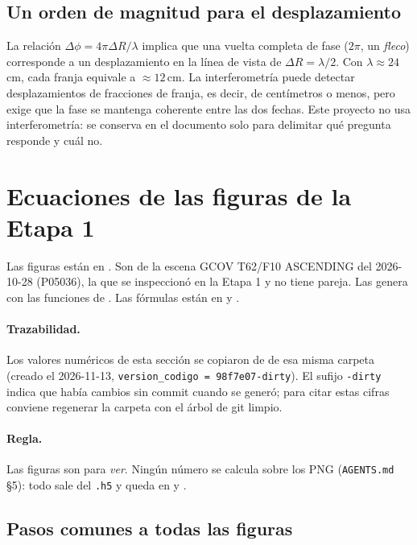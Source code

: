 \documentclass[11pt,a4paper]{article}
\begin{document}
\subsection{Un orden de magnitud para el desplazamiento}

La relación $\Delta\phi=4\pi\Delta R/\lambda$ implica que una vuelta completa de fase ($2\pi$, un \emph{fleco})
corresponde a un desplazamiento en la línea de vista de $\Delta R=\lambda/2$. Con $\lambda\approx24$\,cm, cada
franja equivale a $\approx12$\,cm. La interferometría puede detectar desplazamientos de fracciones de franja,
es decir, de centímetros o menos, pero exige que la fase se mantenga coherente entre las dos fechas. Este
proyecto no usa interferometría: se conserva en el documento solo para delimitar qué pregunta responde y
cuál no.

\section{Ecuaciones de las figuras de la Etapa 1}
\label{sec:figuras}

Las figuras están en
.
Son de la escena GCOV T62/F10 ASCENDING del 2026-10-28 (P05036), la que se inspeccionó en la Etapa 1 y no tiene pareja. Las genera
 con las funciones de . Las fórmulas están en
 y .

\paragraph{Trazabilidad.} Los valores numéricos de esta sección se copiaron de  de esa misma carpeta (creado el
2026-11-13, \texttt{version\_codigo = 98f7e07-dirty}). El sufijo \texttt{-dirty} indica que había cambios sin commit cuando se generó;
para citar estas cifras conviene regenerar la carpeta con el árbol de git limpio.

\paragraph{Regla.} Las figuras son para \emph{ver}. Ningún número se calcula sobre los PNG (\texttt{AGENTS.md} §5): todo sale del
\texttt{.h5} y queda en  y .

\subsection{Pasos comunes a todas las figuras}
\end{document}
